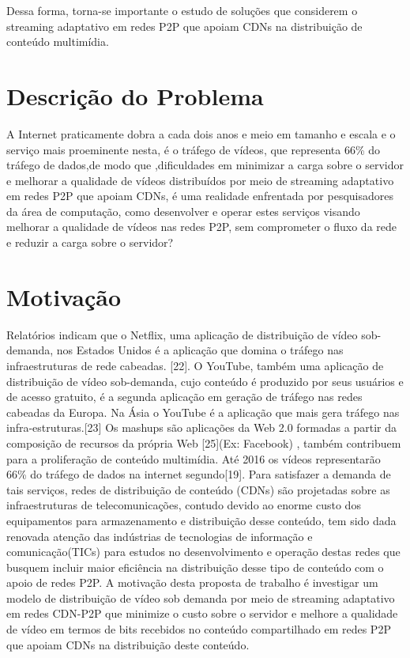 \documentclass[
	12pt,				%
	oneside,			%
	a4paper,			%
	english,			%
	brazil				%
	]{abntex2ppgsi}
\begin{document}
Dessa forma, torna-se importante o estudo de soluções que considerem o streaming adaptativo em redes P2P que apoiam CDNs na distribuição de conteúdo multimídia.

\section{Descrição do Problema}
 
A Internet praticamente dobra a cada dois anos e meio em tamanho e escala e o serviço mais proeminente nesta, é o tráfego de vídeos, que representa 66\% do tráfego de dados,de modo que ,dificuldades em minimizar a carga sobre o servidor e melhorar a qualidade de vídeos distribuídos por meio de streaming adaptativo em redes P2P que apoiam CDNs, é uma realidade enfrentada por pesquisadores da área de computação,  como desenvolver e operar estes serviços visando melhorar a qualidade de vídeos nas redes P2P, sem comprometer o fluxo da rede e reduzir a carga sobre o servidor?

\section{Motivação}

Relatórios indicam que o Netflix, uma aplicação de distribuição de vídeo sob-demanda, nos Estados Unidos é a aplicação que domina o tráfego nas infraestruturas de rede cabeadas. [22]. O YouTube, também uma aplicação de distribuição de vídeo sob-demanda, cujo conteúdo é produzido por seus usuários e de acesso gratuito, é a segunda aplicação em geração de tráfego nas redes cabeadas da Europa. Na Ásia o YouTube é a aplicação que mais gera tráfego nas infra-estruturas.[23]
Os mashups são aplicações da Web 2.0 formadas a partir da composição de recursos da própria Web [25](Ex: Facebook) , também contribuem para a proliferação de conteúdo multimídia. Até 2016 os vídeos representarão 66\% do tráfego de dados na internet segundo[19].
Para satisfazer a demanda de tais serviços, redes de distribuição de conteúdo (CDNs) são projetadas sobre as infraestruturas de telecomunicações, contudo devido ao enorme custo dos equipamentos para armazenamento e distribuição desse conteúdo, tem sido dada renovada atenção das indústrias de tecnologias de informação e comunicação(TICs) para estudos no desenvolvimento e operação destas redes que busquem incluir maior eficiência na distribuição desse tipo de conteúdo com o apoio de redes P2P.
A motivação desta proposta de trabalho é investigar  um modelo de distribuição de vídeo sob demanda por meio de streaming adaptativo em redes CDN-P2P que minimize o custo sobre o servidor e melhore a qualidade de vídeo em termos de bits recebidos no conteúdo compartilhado em redes P2P que apoiam CDNs na distribuição deste conteúdo.
\end{document}
